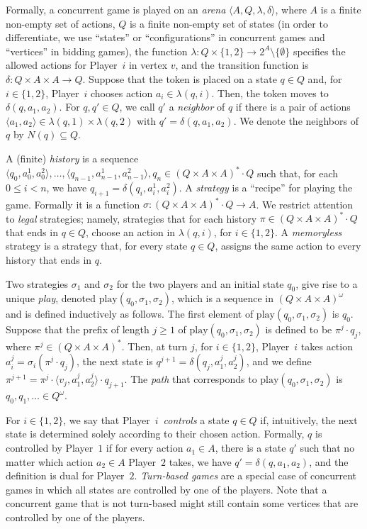 \documentclass{theoretics}
\newcommand{\PO}{Player~$1$\xspace}
\newcommand{\PT}{Player~$2$\xspace}
\newcommand{\PLi}{Player~$i$\xspace}
\newcommand{\play}{\text{play}\xspace}
\newcommand{\zug}[1]{\langle #1  \rangle}
\renewcommand{\set}[1]{\{ #1  \}}
\begin{document}
Formally, a concurrent game is played on an {\em arena} $\zug{A, Q, \lambda, \delta}$, where $A$ is a finite non-empty set of actions, $Q$ is a finite non-empty set of states (in order to differentiate, we use ``states'' or ``configurations'' in concurrent games and ``vertices'' in bidding games), the function $\lambda: Q \times \set{1,2} \rightarrow 2^A \setminus \{\emptyset\}$ specifies the allowed actions for \PLi in vertex $v$, and the transition function is $\delta: Q \times A \times A \rightarrow Q$. Suppose that the token is placed on a state $q \in Q$ and, for $i \in \set{1,2}$, \PLi chooses action $a_i \in \lambda(q, i)$. Then, the token moves to $\delta(q, a_1, a_2)$. For $q,q' \in Q$, we call $q'$ a {\em neighbor} of $q$ if there is a pair of actions $\zug{a_1,a_2} \in \lambda(q, 1) \times \lambda(q, 2)$ with $q' = \delta(q, a_1, a_2)$. We denote the neighbors of $q$ by $N(q) \subseteq Q$.


A (finite) {\em history} is a sequence  $\zug{q_0,a^1_0, a^2_0},\ldots, \zug{q_{n-1},a^1_{n-1},a^2_{n-1}}, q_n \in (Q \times A \times A)^*\cdot Q$ such that, for each $0 \leq i <n$, we have $q_{i+1} = \delta(q_i, a^1_i, a^2_i)$. 
A {\em strategy} is a ``recipe'' for playing the game. Formally it is a function $\sigma: (Q \times A \times A)^*\cdot Q \rightarrow A$. We restrict attention to {\em legal} strategies; namely, strategies that for each history $\pi \in (Q \times A \times A)^*\cdot Q$ that ends in $q \in Q$, choose an action in $\lambda(q, i)$, for $i \in \set{1,2}$. A {\em memoryless} strategy is a strategy that, for every state $q \in Q$, assigns the same action to every history that ends in $q$. 

Two strategies $\sigma_1$ and $\sigma_2$ for the two players and an initial state $q_0$, give rise to a unique {\em play}, denoted $\play(q_0, \sigma_1, \sigma_2)$, which is a sequence in $(Q \times A \times A)^\omega$ and is defined inductively as follows. The first element of $\play(q_0, \sigma_1, \sigma_2)$ is $q_0$. Suppose that the prefix of length $j \geq 1$ of \(\play(q_0, \sigma_1, \sigma_2)\) is defined to be $\pi^j \cdot q_j$, where $\pi^j \in (Q \times A \times A)^*$. Then, at turn $j$, for $i \in \set{1,2}$, \PLi takes action $a^j_i = \sigma_i(\pi^j \cdot q_j)$, the next state is $q^{j+1} = \delta(q_j, a^j_1, a^j_2)$, and we define $\pi^{j+1} = \pi^j \cdot \zug{v_j, a^j_1, a^j_2} \cdot q_{j+1}$. The {\em path} that corresponds to $\play(q_0, \sigma_1, \sigma_2)$ is $q_0,q_1,\ldots \in Q^\omega$. 

For $i \in \set{1,2}$, we say that \PLi ~{\em controls} a state $q \in Q$ if, intuitively, the next state is determined solely according to their chosen action. Formally, $q$ is controlled by \PO if for every action $a_1 \in A$, there is a state $q'$ such that no matter which action $a_2 \in A$ \PT takes, we have $q' = \delta(q, a_1, a_2)$, and the definition is dual for \PT. {\em Turn-based games} are a special case of concurrent games in which all states are controlled by one of the players.  Note that a concurrent game that is not turn-based might still contain some vertices that are controlled by one of the players. 
\end{document}
